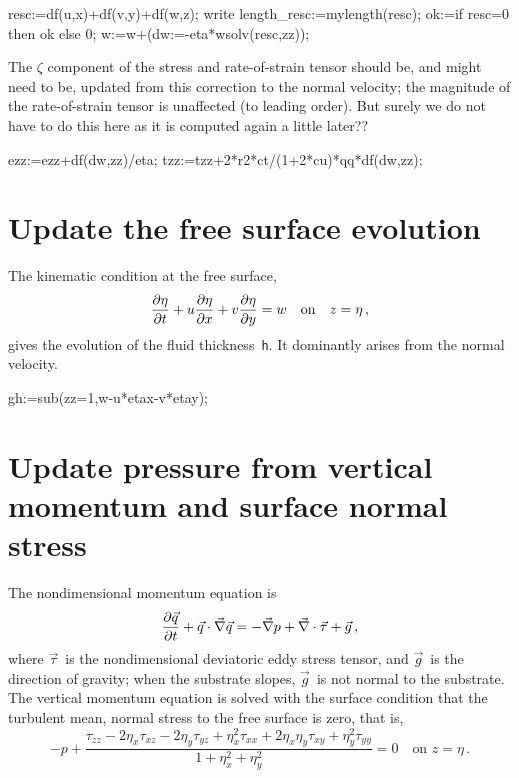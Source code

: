 \documentclass[12pt,a5paper]{article}
\newcommand{\zs}{\zeta}
\begin{document}
\begin{reduce}
resc:=df(u,x)+df(v,y)+df(w,z);
write length_resc:=mylength(resc);
ok:=if resc=0 then ok else 0;
w:=w+(dw:=-eta*wsolv(resc,zz));
\end{reduce}

The $\zs$ component of the stress and rate-of-strain tensor should be, and might need to be, updated from this correction to the normal velocity;  the magnitude of the rate-of-strain tensor is unaffected (to leading order).  But surely we do not have to do this here as it is computed again a little later??

\begin{reduce}
ezz:=ezz+df(dw,zz)/eta;
tzz:=tzz+2*r2*ct/(1+2*cu)*qq*df(dw,zz);
\end{reduce}





\section{Update the free surface evolution}

The kinematic condition at the free surface, 
\begin{equation}
    \D t\eta+u\D x\eta+v\D y\eta=w\quad\text{on}\quad z=\eta\,,
\end{equation}
gives the evolution of the fluid thickness~\verb|h|.  It dominantly arises from the normal velocity.

\begin{reduce}
gh:=sub(zz=1,w-u*etax-v*etay);
\end{reduce}










\section{Update pressure from vertical momentum and surface normal stress}

The nondimensional momentum equation is
\begin{equation}
    \D t{\vec q} +\vec q\cdot\grad\vec q
    =-\grad p +\divv\vec\tau +\vec{g}\,,
\end{equation}
where $\vec\tau$~is the
nondimensional deviatoric eddy stress tensor, and $\vec g$~is the direction of gravity; when the substrate slopes, $\vec{g}$~is not normal to the substrate. 
The vertical momentum equation is solved with the surface condition that
the turbulent mean, normal stress to the free surface is zero, that is, 
\begin{equation}
    -p+\frac{\tau_{zz} -2\eta_x\tau_{xz} -2\eta_y\tau_{yz}
    +\eta_x^2\tau_{xx} +2\eta_x\eta_y\tau_{xy}+\eta_y^2\tau_{yy}}
    {1+\eta_x^2+\eta_y^2}
     =0 \quad\text{on }
    z=\eta\,.
\end{equation}
\end{document}
